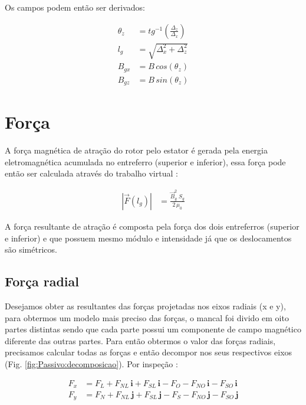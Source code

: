 Os campos podem então ser derivados:

\begin{align}
\theta_z &= tg^{-1}(\frac{\Delta_z}{\Delta_x}) \\
l_g &= \sqrt{\Delta_x^2 + \Delta_z^2} \\
B_{gx} &= B \, cos(\theta_z) \\
B_{gz} &= B \, sin(\theta_z) 
\end{align}


\section{Força}

A força magnética de atração do rotor pelo estator é gerada pela energia eletromagnética acumulada no entreferro (superior e inferior), essa força pode então ser calculada através do trabalho virtual \citep{Chiba}:

\begin{align}
|\vec{F}(l_g)| &=  \frac{ \vec{B}_{g}^2 \; S_g}{2 \, \mu_0} \label{eq:passivo:Fx}
\end{align}

A força resultante de atração é composta pela força dos dois entreferros (superior e inferior) e que possuem mesmo módulo e intensidade já que os deslocamentos são simétricos. 

\subsection{Força radial} \label{subsection:forca:x}


Desejamos obter as resultantes das forças projetadas nos eixos radiais (x e y), para obtermos um modelo mais preciso das forças, o mancal foi divido em oito partes distintas sendo que cada parte possui um componente de campo magnético diferente das outras partes. Para então obtermos o valor das forças radiais, precisamos calcular todas as forças e então decompor nos seus respectivos eixos (Fig. \ref{fig:Passivo:decomposicao}). Por inspeção :

\begin{align}
F_x &= F_{L} + F_{NL} \, \boldsymbol{i} + F_{SL} \, \boldsymbol{i} - F_{O} - F_{NO} \, \boldsymbol{i}  - F_{SO} \, \boldsymbol{i} \label{eq:p:F:resultante:x} \\
F_y &= F_{N} + F_{NL} \, \boldsymbol{j} + F_{SL} \, \boldsymbol{j} - F_{S} - F_{NO} \, \boldsymbol{j}  - F_{SO} \, \boldsymbol{j}
\label{eq:p:F:resultante:y} 
\end{align}


